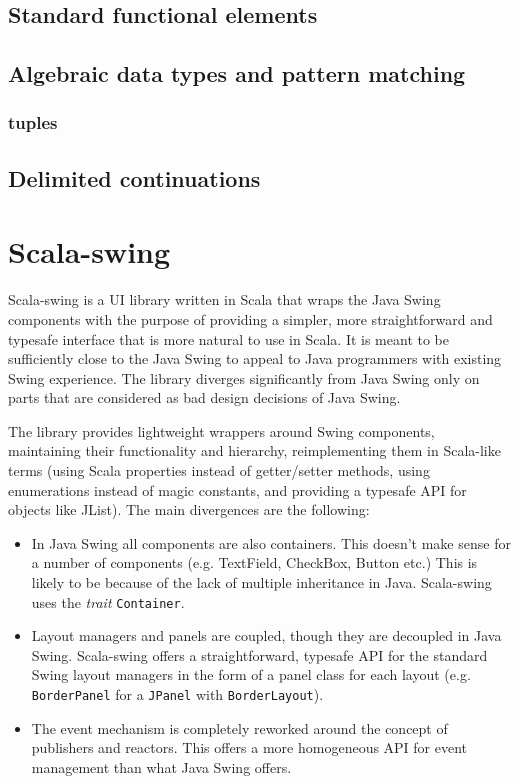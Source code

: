 \subsection{Standard functional elements}

\subsection{Algebraic data types and pattern matching}

\subsubsection{tuples}

\subsection{Delimited continuations}




\section{Scala-swing}

Scala-swing is a UI library written in Scala that wraps the Java Swing components with the purpose of providing a simpler, more straightforward and typesafe interface that is more natural to use in Scala. It is meant to be sufficiently close to the Java Swing to appeal to Java programmers with existing Swing experience.\cite{ScalaSwing} The library diverges significantly from Java Swing only on parts that are considered as bad design decisions of Java Swing.

The library provides lightweight wrappers around Swing components, maintaining their functionality and hierarchy, reimplementing them in Scala-like terms (using Scala properties instead of getter/setter methods, using enumerations instead of magic constants, and providing a typesafe API for objects like JList). The main divergences are the following:
\begin{itemize}
\item In Java Swing all components are also containers. This doesn't make sense for a number of components (e.g. TextField, CheckBox, Button etc.) This is likely to be because of the lack of multiple inheritance in Java. Scala-swing uses the \emph{trait} \texttt{Container}.

\item Layout managers and panels are coupled, though they are decoupled in Java Swing. Scala-swing offers a straightforward, typesafe API for the standard Swing layout managers in the form of a panel class for each layout (e.g. \texttt{BorderPanel} for a \texttt{JPanel} with \texttt{BorderLayout}).

\item The event mechanism is completely reworked around the concept of publishers and reactors. This offers a more homogeneous API for event management than what Java Swing offers.
\end{itemize}


